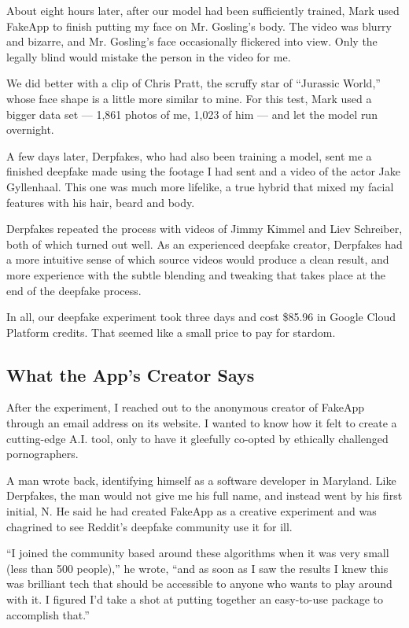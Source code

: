 About eight hours later, after our model had been sufficiently trained,
Mark used FakeApp to finish putting my face on Mr. Gosling's body. The
video was blurry and bizarre, and Mr. Gosling's face occasionally
flickered into view. Only the legally blind would mistake the person in
the video for me.

We did better with a clip of Chris Pratt, the scruffy star of ``Jurassic
World,'' whose face shape is a little more similar to mine. For this
test, Mark used a bigger data set --- 1,861 photos of me, 1,023 of him
--- and let the model run overnight.

A few days later, Derpfakes, who had also been training a model, sent me
a finished deepfake made using the footage I had sent and a video of the
actor Jake Gyllenhaal. This one was much more lifelike, a true hybrid
that mixed my facial features with his hair, beard and body.

Derpfakes repeated the process with videos of Jimmy Kimmel and Liev
Schreiber, both of which turned out well. As an experienced deepfake
creator, Derpfakes had a more intuitive sense of which source videos
would produce a clean result, and more experience with the subtle
blending and tweaking that takes place at the end of the deepfake
process.

In all, our deepfake experiment took three days and cost \$85.96 in
Google Cloud Platform credits. That seemed like a small price to pay for
stardom.

\hypertarget{what-the-apps-creator-says}{%
\subsection{What the App's Creator
Says}\label{what-the-apps-creator-says}}

After the experiment, I reached out to the anonymous creator of FakeApp
through an email address on its website. I wanted to know how it felt to
create a cutting-edge A.I. tool, only to have it gleefully co-opted by
ethically challenged pornographers.

A man wrote back, identifying himself as a software developer in
Maryland. Like Derpfakes, the man would not give me his full name, and
instead went by his first initial, N. He said he had created FakeApp as
a creative experiment and was chagrined to see Reddit's deepfake
community use it for ill.

``I joined the community based around these algorithms when it was very
small (less than 500 people),'' he wrote, ``and as soon as I saw the
results I knew this was brilliant tech that should be accessible to
anyone who wants to play around with it. I figured I'd take a shot at
putting together an easy-to-use package to accomplish that.''

